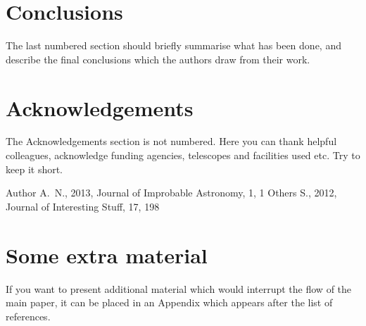 \documentclass[a4paper,fleqn,usenatbib]{mnras}
\begin{document}
\section{Conclusions}

The last numbered section should briefly summarise what has been done, and describe
the final conclusions which the authors draw from their work.

\section*{Acknowledgements}

The Acknowledgements section is not numbered. Here you can thank helpful
colleagues, acknowledge funding agencies, telescopes and facilities used etc.
Try to keep it short.




%


\begin{thebibliography}{99}
Author A.~N., 2013, Journal of Improbable Astronomy, 1, 1
Others S., 2012, Journal of Interesting Stuff, 17, 198
\end{thebibliography}



\appendix

\section{Some extra material}

If you want to present additional material which would interrupt the flow of the main paper,
it can be placed in an Appendix which appears after the list of references.



\bsp	%
\label{lastpage}
\end{document}
